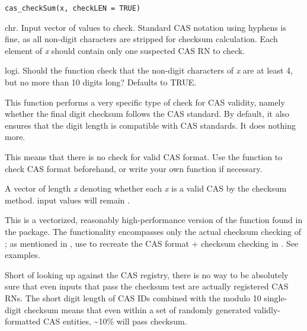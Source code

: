 \documentclass[letterpaper]{book}
\begin{document}
%
\begin{Usage}
\begin{verbatim}
cas_checkSum(x, checkLEN = TRUE)
\end{verbatim}
\end{Usage}
%
\begin{Arguments}
\begin{ldescription}
\item[\code{x}] chr. Input vector of values to check. Standard CAS notation using hyphens is fine, as
all non-digit characters are stripped for checksum calculation. Each element of \emph{x} should contain
only one suspected CAS RN to check.

\item[\code{checkLEN}] logi. Should the function check that the non-digit characters of \emph{x} are at least 4, but no
more than 10 digits long? Defaults to TRUE.
\end{ldescription}
\end{Arguments}
%
\begin{Details}\relax
This function performs a very specific type of check for CAS validity, namely whether the final digit checksum follows
the CAS standard. By default, it also ensures that the digit length is compatible with CAS standards. It does nothing
more.

This means that there is no check for valid CAS format. Use the  function to check CAS
format beforehand, or write your own function if necessary.
\end{Details}
%
\begin{Value}
A  vector of length \emph{x} denoting whether each \emph{x} is a valid CAS by the checksum method. 
input values will remain .
\end{Value}
%
\begin{Note}\relax
This is a vectorized, reasonably high-performance version of the  function found
in the  package. The functionality encompasses only the actual checksum checking of ;
as mentioned in , use  to recreate the CAS format + checksum checking in
. See examples.

Short of looking up against the CAS registry, there is no way to be absolutely sure that even inputs that pass
the checksum test are actually registered CAS RNs. The short digit length of CAS IDs combined with the modulo 10 single-
digit checksum means that even within a set of randomly generated validly-formatted CAS entities, \textasciitilde{}10\% will pass checksum.
\end{Note}
\end{document}
